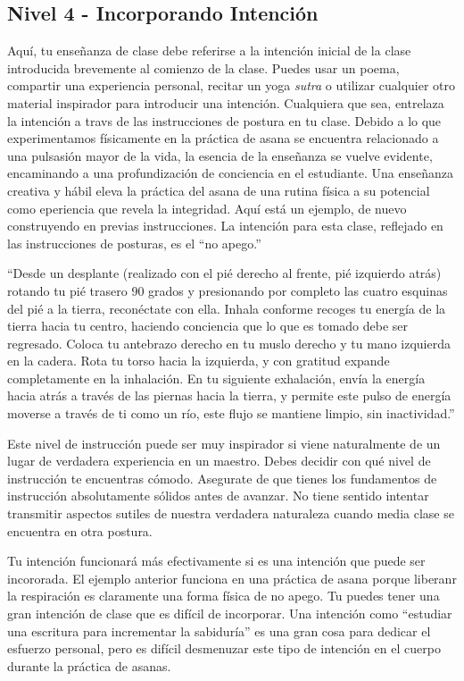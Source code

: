 \subsection{Nivel 4 - Incorporando Intención}
Aquí, tu enseñanza de clase debe referirse a la intención inicial de la clase introducida brevemente al comienzo de la clase. Puedes usar un poema, compartir una experiencia personal, recitar un yoga \textit{sutra} o utilizar cualquier otro material inspirador para introducir una intención. Cualquiera que sea, entrelaza la intención a travs de las instrucciones de postura en tu clase. Debido a lo que experimentamos físicamente en la práctica de asana se encuentra relacionado a una pulsasión mayor de la vida, la esencia de la enseñanza se vuelve evidente, encaminando a una profundización de conciencia en el estudiante. Una enseñanza creativa y hábil eleva la práctica del asana de una rutina física a su potencial como eperiencia que revela la integridad. Aquí está un ejemplo, de nuevo construyendo en previas instrucciones. La intención para esta clase, reflejado en las instrucciones de posturas, es el ``no apego.''

``Desde un desplante (realizado con el pi\'e derecho al frente, pi\'e izquierdo atrás) rotando tu pi\'e trasero 90 grados y presionando por completo las cuatro esquinas del pi\'e a la tierra, recon\'ectate con ella. Inhala conforme recoges tu energía de la tierra hacia tu centro, haciendo conciencia que lo que es tomado debe ser regresado. Coloca tu antebrazo derecho en tu muslo derecho y tu mano izquierda en la cadera. Rota tu torso hacia la izquierda, y con gratitud expande completamente en la inhalación. En tu siguiente exhalación, envía la energía hacia atrás a trav\'es de las piernas hacia la tierra, y permite este pulso de energía moverse a trav\'es de ti como un río, este flujo se mantiene limpio, sin inactividad.''

Este nivel de instrucción puede ser muy inspirador si viene naturalmente de un lugar de verdadera experiencia en un maestro. Debes decidir con qu\'e nivel de instrucción te encuentras cómodo. Asegurate de que tienes los fundamentos de instrucción absolutamente sólidos antes de avanzar. No tiene sentido intentar transmitir aspectos sutiles de nuestra verdadera naturaleza cuando media clase se encuentra en otra postura.

Tu intención funcionará más efectivamente si es una intención que puede ser incororada. El ejemplo anterior funciona en una práctica de asana porque liberanr la respiración es claramente una forma física de no apego. Tu puedes tener una gran intención de clase que es difícil de incorporar. Una intención como ``estudiar una escritura para incrementar la sabiduría'' es una gran cosa para dedicar el esfuerzo personal, pero es difícil desmenuzar este tipo de intención en el cuerpo durante la práctica de asanas.


